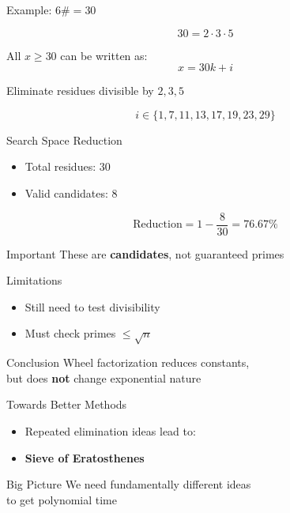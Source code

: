 \documentclass{beamer}
\begin{document}

\begin{frame}{Example: $6\# = 30$}

\[
30 = 2 \cdot 3 \cdot 5
\]

All $x \ge 30$ can be written as:
\[
x = 30k + i
\]

Eliminate residues divisible by $2,3,5$

\[
i \in \{1,7,11,13,17,19,23,29\}
\]

\end{frame}


\begin{frame}{Search Space Reduction}

\begin{itemize}
    \item Total residues: $30$
    \item Valid candidates: $8$
\end{itemize}

\[
\text{Reduction} = 1 - \frac{8}{30} = 76.67\%
\]

\begin{block}{Important}
These are \textbf{candidates}, not guaranteed primes
\end{block}

\end{frame}


\begin{frame}{Limitations}

\begin{itemize}
    \item Still need to test divisibility
    \item Must check primes $\le \sqrt{n}$
\end{itemize}

\begin{block}{Conclusion}
Wheel factorization reduces constants, \\
but does \textbf{not} change exponential nature
\end{block}

\end{frame}


\begin{frame}{Towards Better Methods}

\begin{itemize}
    \item Repeated elimination ideas lead to:
    \item \textbf{Sieve of Eratosthenes}
\end{itemize}

\begin{block}{Big Picture}
We need fundamentally different ideas \\
to get polynomial time
\end{block}

\end{frame}
\end{document}
